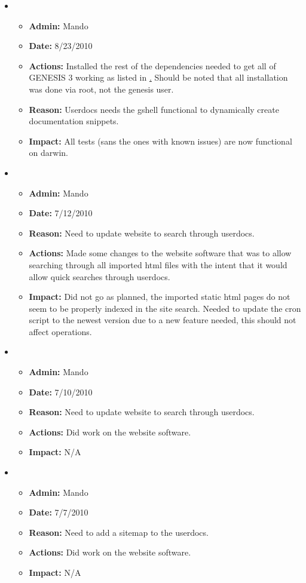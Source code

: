 \documentclass[12pt]{article}
\begin{document}
\begin{itemize}
\item 
\begin{itemize}
\item[] {\bf Admin:} Mando
\item[] {\bf Date:} 8/23/2010
\item[] {\bf Actions:} Installed the rest of the dependencies needed to get all of GENESIS 3 working as listed in \href{../installation-fedora12/installation-fedora12.tex}. Should be noted that all installation was done via root, not the genesis user.
\item[] {\bf Reason:} Userdocs needs the gshell functional to dynamically create documentation snippets. 
\item[] {\bf Impact:} All tests (sans the ones with known issues) are now functional on darwin.
\end{itemize}
	
\item 
\begin{itemize}
\item[] {\bf Admin:} Mando
\item[] {\bf Date:} 7/12/2010
\item[] {\bf Reason:} Need to update website to search through userdocs. 
\item[] {\bf Actions:} Made some changes to the website software that was to allow searching through all imported html files with the intent that it would allow quick searches through userdocs.  
\item[] {\bf Impact:} Did not go as planned, the imported static html pages do not seem to be properly indexed in the site search. Needed to update the cron script to the newest version due to a new feature needed, this should not affect operations.
\end{itemize}

\item 
\begin{itemize}
\item[] {\bf Admin:} Mando
\item[] {\bf Date:} 7/10/2010
\item[] {\bf Reason:} Need to update website to search through userdocs. 
\item[] {\bf Actions:} Did work on the website software. 
\item[] {\bf Impact:} N/A
\end{itemize}

\item 
\begin{itemize}
\item[] {\bf Admin:} Mando
\item[] {\bf Date:} 7/7/2010
\item[] {\bf Reason:} Need to add a sitemap to the userdocs.
\item[] {\bf Actions:} Did work on the website software. 
\item[] {\bf Impact:} N/A
\end{itemize}


\end{itemize}
\end{document}
